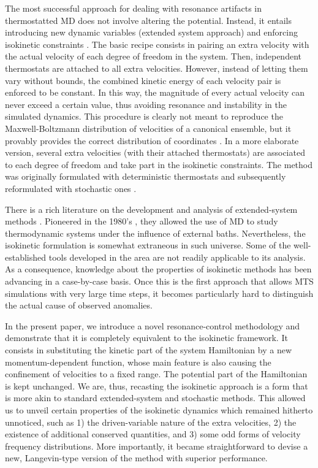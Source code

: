 \documentclass[
aip,
jcp,
reprint,
]{revtex4-1}
\begin{document}
The most successful approach for dealing with resonance artifacts in thermostatted MD does not involve altering the potential.
Instead, it entails introducing new dynamic variables (extended system approach) and enforcing isokinetic constraints \cite{Minary_2003, Minary_2003_2, Minary_2004, Leimkuhler_2013}.
The basic recipe consists in pairing an extra velocity with the actual velocity of each degree of freedom in the system.
Then, independent thermostats are attached to all extra velocities.
However, instead of letting them vary without bounds, the combined kinetic energy of each velocity pair is enforced to be constant.
In this way, the magnitude of every actual velocity can never exceed a certain value, thus avoiding resonance and instability in the simulated dynamics.
This procedure is clearly not meant to reproduce the Maxwell-Boltzmann distribution of velocities of a canonical ensemble, but it provably provides the correct distribution of coordinates \cite{Minary_2003, Minary_2003_2, Minary_2004, Leimkuhler_2013}.
In a more elaborate version, several extra velocities (with their attached thermostats) are associated to each degree of freedom and take part in the isokinetic constraints.
The method was originally formulated \cite{Minary_2003, Minary_2003_2, Minary_2004} with deterministic thermostats \cite{Martyna_1992} and subsequently reformulated \cite{Leimkuhler_2013} with stochastic ones \cite{Samoletov_2007, Leimkuhler_2009}.

There is a rich literature on the development and analysis of extended-system methods \cite{Martyna_1996, Tuckerman_1999, Tuckerman_2001, Sergi_2001, Ezra_2004, Tuckerman_2010}.
Pioneered in the 1980's \cite{Andersen_1980, Nose_1984, Hoover_1985}, they allowed the use of MD to study thermodynamic systems under the influence of external baths.
Nevertheless, the isokinetic formulation is somewhat extraneous in such universe.
Some of the well-established tools developed in the area are not readily applicable to its analysis.
As a consequence, knowledge about the properties of isokinetic methods has been advancing in a case-by-case basis.
Once this is the first approach that allows MTS simulations with very large time steps, it becomes particularly hard to distinguish the actual cause of observed anomalies.

In the present paper, we introduce a novel resonance-control methodology and demonstrate that it is completely equivalent to the isokinetic framework.
It consists in substituting the kinetic part of the system Hamiltonian by a new momentum-dependent function, whose main feature is also causing the confinement of velocities to a fixed range.
The potential part of the Hamiltonian is kept unchanged.
We are, thus, recasting the isokinetic approach is a form that is more akin to standard extended-system and stochastic methods.
This allowed us to unveil certain properties of the isokinetic dynamics which remained hitherto unnoticed, such as 1) the driven-variable nature of the extra velocities, 2) the existence of additional conserved quantities, and 3) some odd forms of velocity frequency distributions.
More importantly, it became straightforward to devise a new, Langevin-type version of the method with superior performance.
\end{document}
